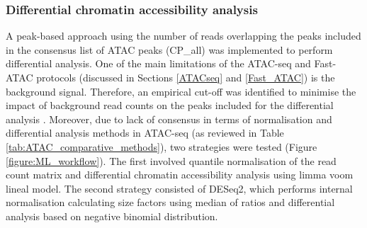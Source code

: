 

\subsubsection{Differential chromatin accessibility analysis}

A peak-based approach using the number of reads overlapping the peaks included in the consensus list of ATAC peaks (CP\_all) was implemented to perform differential analysis. One of the main limitations of the ATAC-seq and Fast-ATAC protocols (discussed in Sections \ref{ATACseq} and \ref{Fast_ATAC}) is the background signal. Therefore, an empirical cut-off was identified to minimise the impact of background read counts on the peaks included for the differential analysis \parencite{Xinmin2005,Jonker2014}. Moreover, due to lack of consensus in terms of normalisation and differential analysis methods in ATAC-seq (as reviewed in Table \ref{tab:ATAC_comparative_methods}), two strategies were tested (Figure \ref{figure:ML_workflow}). The first involved quantile normalisation of the read count matrix and differential chromatin accessibility analysis using limma voom lineal model. The second strategy consisted of DESeq2, which performs internal normalisation calculating size factors using median of ratios and differential analysis based on negative binomial distribution.

